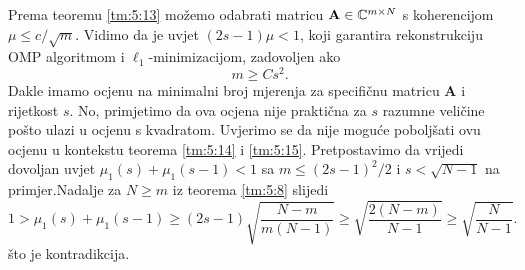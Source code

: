 \documentclass[a4paper,twoside,12pt]{memoir} %
\newcommand{\vect}[1]{\mathbf{#1}}
\renewcommand{\vec}{\vect}
\begin{document}
Prema teoremu \ref{tm:5:13} mo\v{z}emo odabrati matricu $\vec A \in \C^{m \times N}$ s koherencijom $\mu \leq c/\sqrt{m}$. Vidimo da je uvjet $(2s - 1)\mu < 1$, koji garantira rekonstrukciju OMP algoritmom i $\ell_1$-minimizacijom, zadovoljen ako
\begin{equation}\label{5:15}
    m \geq Cs^2.
\end{equation}
Dakle imamo ocjenu na minimalni broj mjerenja za specifi\v{c}nu matricu $\vec A$ i rijetkost $s$. No, primjetimo da ova ocjena nije prakti\v{c}na za $s$ razumne veli\v{c}ine po\v{s}to ulazi u ocjenu s kvadratom. Uvjerimo se da nije mogu\'ce pobolj\v{s}ati ovu ocjenu u kontekstu teorema \ref{tm:5:14} i \ref{tm:5:15}. Pretpostavimo da vrijedi dovoljan uvjet $\mu_1(s) + \mu_1(s-1) < 1$ sa $m  \leq (2s-1)^2/2$ i $s < \sqrt{N-1}$ na primjer.Nadalje za $N \geq m$ iz teorema \ref{tm:5:8} slijedi
\begin{equation*}
    1 > \mu_1(s) + \mu_1(s-1) \geq (2s-1) \sqrt{\frac{N-m}{m(N-1)}} \geq \sqrt{\frac{2(N-m)}{N-1}} \geq \sqrt{\frac{N}{N-1}}.
\end{equation*}
\v{s}to je kontradikcija.
\end{document}
